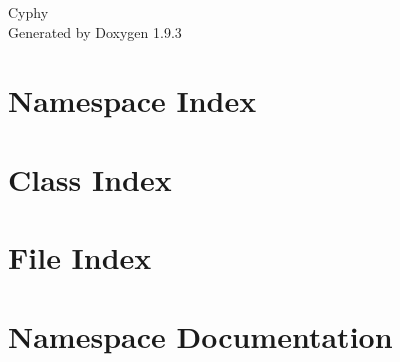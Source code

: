 \documentclass[twoside]{book}
\newcommand{\+}{\discretionary{\mbox{\scriptsize$\hookleftarrow$}}{}{}}
\newcommand{\clearemptydoublepage}{%
    \newpage{\pagestyle{empty}\cleardoublepage}%
  }
\begin{document}
  \raggedbottom
    \hypersetup{pageanchor=false,
                bookmarksnumbered=true,
                pdfencoding=unicode
               }
  \begin{titlepage}
  \vspace*{7cm}
  \begin{center}%
  {\Large Cyphy}\\
  \vspace*{1cm}
  {\large Generated by Doxygen 1.9.3}\\
  \end{center}
  \end{titlepage}
  \clearemptydoublepage
  \tableofcontents
  \clearemptydoublepage
  \hypersetup{pageanchor=true}
\chapter{Namespace Index}

\chapter{Class Index}

\chapter{File Index}

\chapter{Namespace Documentation}










\end{document}
